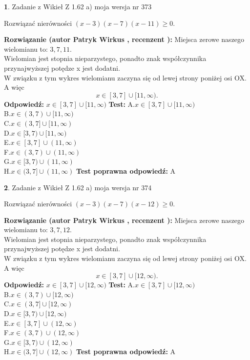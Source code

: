 \documentclass[12pt, a4paper]{article}
\theoremstyle{definition} %
\newtheorem{zad}{}
\newcommand{\zadStart}[1]{\begin{zad}#1\newline}
\newcommand{\zadStop}{\end{zad}}
\newcommand{\rozwStart}[2]{\noindent \textbf{Rozwiązanie (autor #1 , recenzent #2): }\newline}
\newcommand{\rozwStop}{\newline}
\newcommand{\odpStart}{\noindent \textbf{Odpowiedź:}\newline}
\newcommand{\odpStop}{\newline}
\newcommand{\testStart}{\noindent \textbf{Test:}\newline}
\newcommand{\testStop}{\newline}
\newcommand{\kluczStart}{\noindent \textbf{Test poprawna odpowiedź:}\newline}
\newcommand{\kluczStop}{\newline}
\begin{document}
\zadStart{Zadanie z Wikieł Z 1.62 a) moja wersja nr 373}

Rozwiązać nierówności $(x-3)(x-7)(x-11)\ge0$.
\zadStop
\rozwStart{Patryk Wirkus}{}
Miejsca zerowe naszego wielomianu to: $3, 7, 11$.\\
Wielomian jest stopnia nieparzystego, ponadto znak współczynnika przy\linebreak najwyższej potędze x jest dodatni.\\ W związku z tym wykres wielomianu zaczyna się od lewej strony poniżej osi OX. A więc $$x \in [3,7] \cup [11,\infty).$$
\rozwStop
\odpStart
$x \in [3,7] \cup [11,\infty)$
\odpStop
\testStart
A.$x \in [3,7] \cup [11,\infty)$\\
B.$x \in (3,7) \cup [11,\infty)$\\
C.$x \in (3,7] \cup [11,\infty)$\\
D.$x \in [3,7) \cup [11,\infty)$\\
E.$x \in [3,7] \cup (11,\infty)$\\
F.$x \in (3,7) \cup (11,\infty)$\\
G.$x \in [3,7) \cup (11,\infty)$\\
H.$x \in (3,7] \cup (11,\infty)$
\testStop
\kluczStart
A
\kluczStop



\zadStart{Zadanie z Wikieł Z 1.62 a) moja wersja nr 374}

Rozwiązać nierówności $(x-3)(x-7)(x-12)\ge0$.
\zadStop
\rozwStart{Patryk Wirkus}{}
Miejsca zerowe naszego wielomianu to: $3, 7, 12$.\\
Wielomian jest stopnia nieparzystego, ponadto znak współczynnika przy\linebreak najwyższej potędze x jest dodatni.\\ W związku z tym wykres wielomianu zaczyna się od lewej strony poniżej osi OX. A więc $$x \in [3,7] \cup [12,\infty).$$
\rozwStop
\odpStart
$x \in [3,7] \cup [12,\infty)$
\odpStop
\testStart
A.$x \in [3,7] \cup [12,\infty)$\\
B.$x \in (3,7) \cup [12,\infty)$\\
C.$x \in (3,7] \cup [12,\infty)$\\
D.$x \in [3,7) \cup [12,\infty)$\\
E.$x \in [3,7] \cup (12,\infty)$\\
F.$x \in (3,7) \cup (12,\infty)$\\
G.$x \in [3,7) \cup (12,\infty)$\\
H.$x \in (3,7] \cup (12,\infty)$
\testStop
\kluczStart
A
\kluczStop
\end{document}
